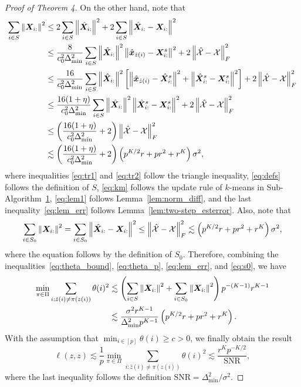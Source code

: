 \documentclass[lettersize,onecolumn,journal]{IEEEtran}
\theoremstyle{definition}
\theoremstyle{definition}
\newcommand{\of}[1]{\left(#1\right)}
\newcommand{\off}[1]{\left[#1\right]}
\begin{document}
\begin{proof}[Proof of Theorem 4]
    On the other hand, note that 
    \begin{align}
         \sum_{i \in S} \onorm{\mX_{i:}}^2 & \leq 2 \sum_{i \in S} \onorm{\hat \mX_{i:}}^2  +  2\sum_{i \in S} \onorm{\hat \mX_{i:} - \mX_{i:}}^2 \label{eq:tr1}\\
         & \leq \frac{8}{c_0^2 \Delta_{\min}^2  } \sum_{i \in S} \onorm{\hat \mX_{i:}}^2   \onorm{\hat \mx_{\hat z(i)} - \mX_{i:}^s }^2 +2 \onorm{\hat \tX - \tX}_F^2 \label{eq:defs} \\
         & \leq \frac{16}{c_0^2 \Delta_{\min}^2  }\sum_{i \in S} \onorm{\hat \mX_{i:}}^2  \off{ \onorm{\hat \mx_{\hat z(i)} - \hat \mX_{i:}^s }^2 + \onorm{\hat \mX_{i:}^s - \mX_{i:}^s }^2 } + 2\onorm{\hat \tX - \tX}_F^2 \label{eq:tr2} \\
         & \leq  \frac{16(1 + \eta)}{c_0^2 \Delta_{\min}^2 }\sum_{i \in S} \onorm{\hat \mX_{i:}}^2  \onorm{\hat \mX_{i:}^s - \mX_{i:}^s }^2  + 2\onorm{\hat \tX - \tX}_F^2 \label{eq:km} \\
         & \leq \of{ \frac{16(1 + \eta)}{c_0^2 \Delta_{\min}^2 } + 2 }\onorm{\hat \tX - \tX}_F^2 \label{eq:lem1}\\
         & \lesssim \of{ \frac{16(1 + \eta)}{c_0^2 \Delta_{\min}^2 } + 2 } \of{ p^{K/2}r + pr^2 + r^K } \sigma^2 \label{eq:lem_err},
    \end{align}
    where inequalities \eqref{eq:tr1} and \eqref{eq:tr2} follow the triangle inequality, \eqref{eq:defs} follows the definition of $S$, \eqref{eq:km} follows the update rule of $k$-means in Sub-Algorithm~\hyperref[alg:main]{1}, \eqref{eq:lem1} follows Lemma~\ref{lem:norm_diff}, and the last inequality~\eqref{eq:lem_err} follows Lemma~\ref{lem:two-step_esterror}. Also, note that 
    \begin{equation}\label{eq:s0}
         \sum_{i \in S_0} \onorm{\mX_{i:}}^2 =  \sum_{i \in S_0} \onorm{\hat \mX_{i:}- \mX_{i:}}^2 \leq \onorm{\hat \tX - \tX}_F^2 \lesssim \of{ p^{K/2}r + pr^2 + r^K } \sigma^2,
    \end{equation}
    where the equation follows by the definition of $S_0$. Therefore, combining the inequalities~\eqref{eq:theta_bound}, \eqref{eq:theta_p}, \eqref{eq:lem_err}, and \eqref{eq:s0}, we have 
    \begin{align}
        \min_{\pi \in \Pi} \sum_{i : \hat z(i) \neq \pi(z(i))} \theta(i)^2  &\lesssim \of{\sum_{i \in S} \onorm{\mX_{i:}}^2 + \sum_{i \in S_0} \onorm{\mX_{i:}}^2  } p^{-(K-1)} r^{K-1} \\
        & \lesssim \frac{\sigma^2 r^{K-1}}{ \Delta_{\min}^2  p^{K-1} } \of{ p^{K/2}r + pr^2 + r^K }.
    \end{align}
    With the assumption that $\min_{i \in [p]} \theta(i) \geq c >0$, we finally obtain the result
    \begin{equation}
        \ell(z, z) \lesssim \frac{1}{p}\min_{\pi \in \Pi} \sum_{i : \hat z(i) \neq \pi(z(i))} \theta(i)^2 \lesssim \frac{r^K p^{-K/2} }{ \text{SNR} },
    \end{equation}
    where the last inequality follows the definition $\text{SNR} = \Delta_{\min}^2/\sigma^2$.
\end{proof}
\end{document}
